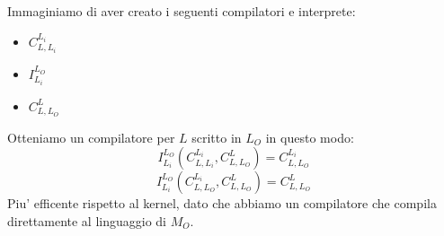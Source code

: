 \begin{itemize}
    Immaginiamo di aver creato i seguenti compilatori e interprete:
    \begin{itemize}
      \item $ C^{L_i}_{L, L_i} $
      \item $ I^{L_O}_{L_i} $
      \item $ C^L_{L, L_O} $
    \end{itemize}
    Otteniamo un compilatore per $ L $ scritto in $ L_O $ in questo modo:
    \[
      I^{L_O}_{L_i}(C^{L_i}_{L, L_i}, C^L_{L, L_O}) = C^{L_i}_{L, L_O}
    \]
    \[
      I^{L_O}_{L_i}(C^{L_i}_{L, L_O}, C^L_{L, L_O}) = C^L_{L, L_O}
    \]
    Piu' efficente rispetto al kernel, dato che abbiamo un compilatore che compila direttamente al linguaggio di $ M_O $.

\end{itemize}
